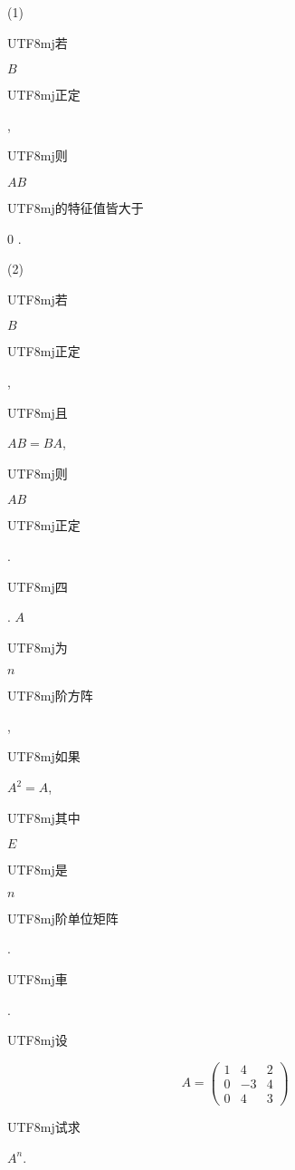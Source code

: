 \documentclass[10pt]{article}
\begin{document}
(1) \begin{CJK}{UTF8}{mj}若\end{CJK} $B$ \begin{CJK}{UTF8}{mj}正定\end{CJK}, \begin{CJK}{UTF8}{mj}则\end{CJK} $A B$ \begin{CJK}{UTF8}{mj}的特征值皆大于\end{CJK} 0 .

(2) \begin{CJK}{UTF8}{mj}若\end{CJK} $B$ \begin{CJK}{UTF8}{mj}正定\end{CJK}, \begin{CJK}{UTF8}{mj}且\end{CJK} $A B=B A$, \begin{CJK}{UTF8}{mj}则\end{CJK} $A B$ \begin{CJK}{UTF8}{mj}正定\end{CJK}.

\begin{CJK}{UTF8}{mj}四\end{CJK}. $A$ \begin{CJK}{UTF8}{mj}为\end{CJK} $n$ \begin{CJK}{UTF8}{mj}阶方阵\end{CJK}, \begin{CJK}{UTF8}{mj}如果\end{CJK} $A^{2}=A$, \begin{CJK}{UTF8}{mj}其中\end{CJK} $E$ \begin{CJK}{UTF8}{mj}是\end{CJK} $n$ \begin{CJK}{UTF8}{mj}阶单位矩阵\end{CJK}.

\begin{CJK}{UTF8}{mj}車\end{CJK}. \begin{CJK}{UTF8}{mj}设\end{CJK}
$$
A=\left(\begin{array}{ccc}
1 & 4 & 2 \\
0 & -3 & 4 \\
0 & 4 & 3
\end{array}\right)
$$
\begin{CJK}{UTF8}{mj}试求\end{CJK} $A^{n}$.
\end{document}

